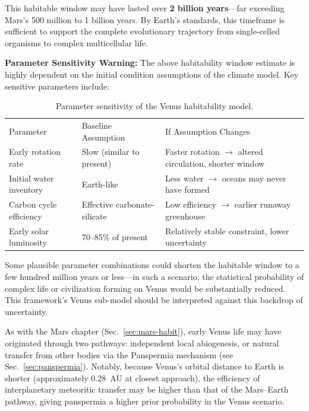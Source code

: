 \documentclass[aps,prd,twocolumn,superscriptaddress,nofootinbib]{revtex4-2}
\begin{document}
This habitable window may have lasted over \textbf{2 billion years}---far exceeding Mars's 500 million to 1 billion years. By Earth's standards, this timeframe is sufficient to support the complete evolutionary trajectory from single-celled organisms to complex multicellular life.

\textbf{Parameter Sensitivity Warning:} The above habitability window estimate is highly dependent on the initial condition assumptions of the climate model. Key sensitive parameters include:

\begin{table}[htbp]
\caption{Parameter sensitivity of the Venus habitability model.}
\label{tab:venus-sensitivity}
\begin{ruledtabular}
\begin{tabular}{lll}
Parameter & Baseline Assumption & If Assumption Changes \\
\colrule
Early rotation rate & Slow (similar to present) & Faster rotation $\to$ altered circulation, shorter window \\
Initial water inventory & Earth-like & Less water $\to$ oceans may never have formed \\
Carbon cycle efficiency & Effective carbonate-silicate & Low efficiency $\to$ earlier runaway greenhouse \\
Early solar luminosity & 70--85\% of present & Relatively stable constraint, lower uncertainty \\
\end{tabular}
\end{ruledtabular}
\end{table}

Some plausible parameter combinations could shorten the habitable window to a few hundred million years or less---in such a scenario, the statistical probability of complex life or civilization forming on Venus would be substantially reduced. This framework's Venus sub-model should be interpreted against this backdrop of uncertainty.

As with the Mars chapter (Sec.~\ref{sec:mars-habit}), early Venus life may have originated through two pathways: independent local abiogenesis, or natural transfer from other bodies via the Panspermia mechanism (see Sec.~\ref{sec:panspermia}). Notably, because Venus's orbital distance to Earth is shorter (approximately \SI{0.28}{AU} at closest approach), the efficiency of interplanetary meteoritic transfer may be higher than that of the Mars--Earth pathway, giving panspermia a higher prior probability in the Venus scenario.
\end{document}
